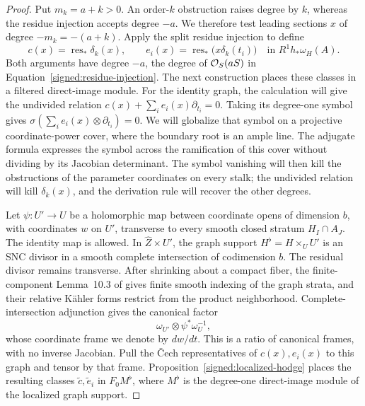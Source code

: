 \begin{proof}
Put \(m_k=a+k>0\).  An order-\(k\) obstruction raises degree by \(k\),
whereas the residue injection accepts degree \(-a\).  We therefore test
leading sections \(x\) of degree \(-m_k=-(a+k)\).  Apply the split residue
injection to define
\[
 c(x)=\operatorname{res}_*\delta_k(x),\qquad
 e_i(x)=\operatorname{res}_*\bigl(x\delta_k(t_i)\bigr)
 \quad\text{in }R^1h_*\omega_H(A).
\]
Both arguments have degree \(-a\), the degree of
\(\mathcal O_S(aS)\) in Equation~\eqref{signed:residue-injection}.
The next construction places these classes in a filtered direct-image
module.  For the identity graph, the calculation will give the undivided
relation \(c(x)+\sum_i e_i(x)\partial_{t_i}=0\).  Taking its degree-one
symbol gives \(\sigma(\sum_i e_i(x)\otimes\partial_{t_i})=0\).
We will globalize that
symbol on a projective coordinate-power cover, where the boundary root is
an ample line.  The adjugate formula expresses the symbol across the
ramification of this cover without dividing by its Jacobian determinant.
The symbol vanishing will then kill the obstructions of the parameter coordinates
on every stalk; the undivided relation will kill \(\delta_k(x)\), and the
derivation rule will recover the other degrees.

Let \(\psi:U'\to U\) be a holomorphic map between coordinate
opens of dimension \(b\), with coordinates \(w\) on \(U'\),
transverse to every smooth closed stratum \(H_I\cap A_J\).
The identity map is allowed.  In \(\widehat Z\times U'\),
the graph support \(H^\flat=H\times_U U'\) is an SNC divisor
in a smooth complete intersection of codimension \(b\).
The residual divisor remains transverse.  After shrinking about a
compact fiber, the finite-component Lemma~10.3 of \cite{BL}
gives finite smooth indexing of the graph strata, and their
relative Kähler forms restrict from the product neighborhood.
Complete-intersection adjunction gives the canonical factor
\[
 \omega_{U'}\otimes\psi^*\omega_U^{-1},
\]
whose coordinate frame we denote by \(dw/dt\).  This is a
ratio of canonical frames, with no inverse Jacobian.  Pull
the Čech representatives of \(c(x),e_i(x)\) to this graph
and tensor by that frame.  Proposition~\ref{signed:localized-hodge}
places the resulting classes \(\widetilde c,\widetilde e_i\)
in \(F_0M^\flat\), where \(M^\flat\) is the degree-one
direct-image module of the localized graph support.


\end{proof}
